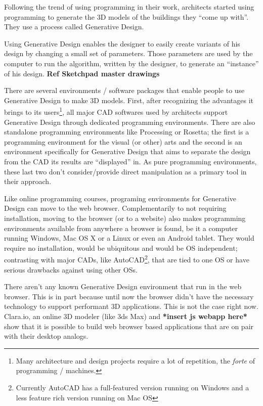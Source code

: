 \documentclass{./llncs2e/llncs}
\begin{document}
Following the trend of using programming in their work, architects started using programming to generate the 3D models of the buildings they ``come up with''. They use a process called Generative Design\cite{terzidis2003expressive}\cite{Maeda:2001:DN:559503}.

Using Generative Design enables the designer to easily create variants of his design by changing a small set of parameters. Those parameters are used by the computer to run the algorithm, written by the designer, to generate an ``instance'' of his design. \cite{Santos20144} \textbf{Ref Sketchpad master drawings}

There are several environments / software packages that enable people to use Generative Design to make 3D models. First, after recognizing the advantages it brings to its users\footnote{Many architecture and design projects require a lot of repetition, the \emph{forte} of programming / machines.}, all major CAD softwares used by architects support Generative Design through dedicated programming environments. There are also standalone programming environments like Processing\cite{reas2007processing} or Rosetta\cite{de2012modern}; the first is a programming environment for the visual (or other) arts and the second is an environment specifically for Generative Design that aims to separate the design from the CAD its results are ``displayed'' in. As pure programming environments, these last two don't consider/provide direct manipulation as a primary tool in their approach.

Like online programming courses, programing environments for Generative Design can move to the web browser. Complementarily to not requiring installation, moving to the browser (or to a website) also makes programming environments available from anywhere a browser is found, be it a computer running Windows, Mac OS X or a Linux or even an Android tablet. They would require no installation, would be ubiquitous and would be OS independent; contrasting with major CADs, like AutoCAD\footnote{Currently AutoCAD has a full-featured version running on Windows and a less feature rich version running on Mac OS}, that are tied to one OS or have serious drawbacks against using other OSs.

There aren't any known Generative Design environment that run in the web browser. This is in part because until now the browser didn't have the necessary technology to support performant 3D applications. This is not the case right now. Clara.io\cite{Houston:2013:CFC:2503673.2503681}, an online 3D modeler (like 3ds Max) and \textbf{*insert js webapp here*} show that it is possible to build web browser based applications that are on pair with their desktop analogs.
\end{document}
